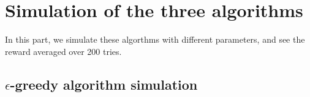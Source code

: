 \documentclass[11pt]{article}
\begin{document}
    \hypertarget{simulation-of-the-three-algorithms}{%
\section{Simulation of the three
algorithms}\label{simulation-of-the-three-algorithms}}

In this part, we simulate these algorthms with different parameters, and
see the reward averaged over 200 tries.

\hypertarget{epsilon-greedy-algorithm-simulation}{%
\subsection{\texorpdfstring{\(\epsilon\)-greedy algorithm
simulation}{\textbackslash epsilon-greedy algorithm simulation}}\label{epsilon-greedy-algorithm-simulation}}
\end{document}

